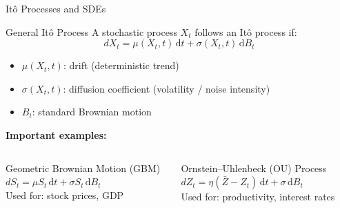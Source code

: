 \documentclass[aspectratio=169,11pt]{beamer}
\newcommand{\emphc}[1]{\textcolor{harvardcrimson}{#1}}
\newcommand{\ud}{\,\mathrm{d}}
\begin{document}
\begin{frame}{It\^o Processes and SDEs}
\small
\begin{block}{General It\^o Process}
A stochastic process $X_t$ follows an \emphc{It\^o process} if:
\vspace{-0.3em}
\[
\boxed{dX_t = \mu(X_t, t)\ud t + \sigma(X_t, t)\ud B_t}
\]
\vspace{-0.5em}
\begin{itemize}\itemsep1pt
    \item $\mu(X_t, t)$: \emphc{drift} (deterministic trend)
    \item $\sigma(X_t, t)$: \emphc{diffusion coefficient} (volatility / noise intensity)
    \item $B_t$: standard Brownian motion
\end{itemize}
\end{block}

\vspace{0.1em}
\textbf{Important examples:}
\begin{columns}[T]
\begin{exampleblock}{\small Geometric Brownian Motion (GBM)}
$dS_t = \mu S_t \ud t + \sigma S_t \ud B_t$\\[2pt]
{\small Used for: stock prices, GDP}
\end{exampleblock}

\begin{exampleblock}{\small Ornstein--Uhlenbeck (OU) Process}
$dZ_t = \eta(\bar{Z} - Z_t)\ud t + \sigma \ud B_t$\\[2pt]
{\small Used for: productivity, interest rates}
\end{exampleblock}
\end{columns}
\end{frame}
\end{document}
